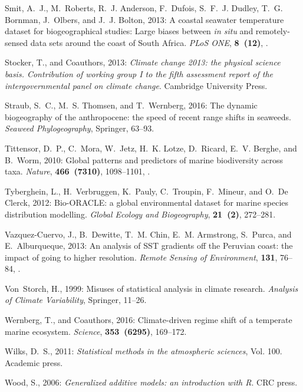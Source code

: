 \documentclass[]{ametsoc}
\begin{document}
\begin{thebibliography}{41}
Smit, A.~J., M.~Roberts, R.~J. Anderson, F.~Dufois, S.~F.~J. Dudley, T.~G.
  Bornman, J.~Olbers, and J.~J. Bolton, 2013: {A coastal seawater temperature
  dataset for biogeographical studies: Large biases between \textit{in situ} and
  remotely-sensed data sets around the coast of South Africa}. \textit{PLoS
  ONE}, \textbf{8~(12)}, .

Stocker, T., and Coauthors, 2013: \textit{Climate change 2013: the
  physical science basis. Contribution of working group I to the fifth
  assessment report of the intergovernmental panel on climate change}.
  Cambridge University Press.

Straub, S.~C., M.~S. Thomsen, and T.~Wernberg, 2016: The dynamic biogeography
  of the anthropocene: the speed of recent range shifts in seaweeds.
  \textit{Seaweed Phylogeography}, Springer, 63--93.

Tittensor, D.~P., C.~Mora, W.~Jetz, H.~K. Lotze, D.~Ricard, E.~V. Berghe, and
  B.~Worm, 2010: {Global patterns and predictors of marine biodiversity across
  taxa.} \textit{Nature}, \textbf{466~(7310)}, 1098--1101,
  .

Tyberghein, L., H.~Verbruggen, K.~Pauly, C.~Troupin, F.~Mineur, and O.~{De
  Clerck}, 2012: {Bio-ORACLE: a global environmental dataset for marine species
  distribution modelling}. \textit{Global Ecology and Biogeography},
  \textbf{21~(2)}, 272--281.

Vazquez-Cuervo, J., B.~Dewitte, T.~M. Chin, E.~M. Armstrong, S.~Purca, and
  E.~Alburqueque, 2013: {An analysis of SST gradients off the Peruvian coast:
  the impact of going to higher resolution}. \textit{Remote Sensing of
  Environment}, \textbf{131}, 76--84, .

Von~Storch, H., 1999: Misuses of statistical analysis in climate research.
  \textit{Analysis of Climate Variability}, Springer, 11--26.

Wernberg, T., and Coauthors, 2016: {Climate-driven regime shift of a temperate
  marine ecosystem}. \textit{Science}, \textbf{353~(6295)}, 169--172.

Wilks, D.~S., 2011: \textit{Statistical methods in the atmospheric sciences},
  Vol. 100. Academic press.

Wood, S., 2006: \textit{Generalized additive models: an introduction with R}.
  CRC press.

\end{thebibliography}
\end{document}
